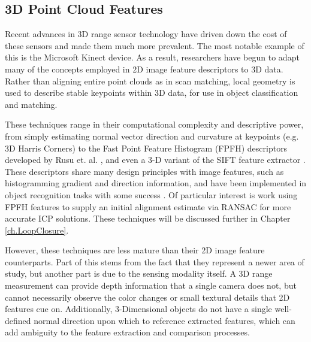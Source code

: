 \subsection{3D Point Cloud Features}

Recent advances in 3D range sensor technology have driven down the cost of these sensors and made them much more prevalent. The most notable example of this is the Microsoft Kinect device. As a result, researchers have begun to adapt many of the concepts employed in 2D image feature descriptors to 3D data. Rather than aligning entire point clouds as in scan matching, local geometry is used to describe stable keypoints within 3D data, for use in object classification and matching. 

These techniques range in their computational complexity and descriptive power, from simply estimating normal vector direction and curvature at keypoints (e.g. 3D Harris Corners) to the Fast Point Feature Histogram (FPFH) descriptors developed by Rusu et. al. \cite{Rusu2009}, and even a 3-D variant of the SIFT feature extractor \cite{Scovanner2007}. These descriptors share many design principles with image features, such as histogramming gradient and direction information, and have been implemented in object recognition tasks with some success \cite{Rusu2009}. Of particular interest is work using FPFH features to supply an initial alignment estimate via RANSAC for more accurate ICP solutions. These techniques will be discussed further in Chapter \ref{ch.LoopClosure}.

However, these techniques are less mature than their 2D image feature counterparts. Part of this stems from the fact that they represent a newer area of study, but another part is due to the sensing modality itself. A 3D range measurement  can provide depth information that a single camera does not, but cannot necessarily observe the color changes or small textural details that 2D features cue on. Additionally, 3-Dimensional objects do not have a single well-defined normal direction upon which to reference extracted features, which can add ambiguity to the feature extraction and comparison processes. 

